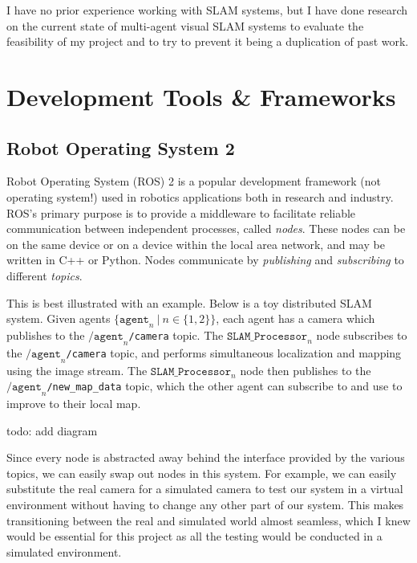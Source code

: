
I have no prior experience working with SLAM systems, but I have done research on the current state of multi-agent visual SLAM systems to evaluate the feasibility of my project and to try to prevent it being a duplication of past work.


\section{Development Tools \& Frameworks}
\label{sec:2.2}

\subsection{Robot Operating System 2}
\label{sec:2.2.1}
Robot Operating System (ROS) 2 is a popular development framework (not operating system!) used in robotics applications both in research and industry. ROS's primary purpose is to provide a middleware to facilitate reliable communication between independent processes, called \textit{nodes}. These nodes can be on the same device or on a device within the local area network, and may be written in C++ or Python. Nodes communicate by \textit{publishing} and \textit{subscribing} to different \textit{topics}.

This is best illustrated with an example. Below is a toy distributed SLAM system. Given agents $\{ \texttt{agent}_n \ | \ n \in \{1, 2\} \}$, each agent has a camera which publishes to the $\texttt{/agent}_n$\verb|/camera| topic. The $\texttt{SLAM\_Processor}_n$ node subscribes to the $\texttt{/agent}_n$\verb|/camera| topic, and performs simultaneous localization and mapping using the image stream. The $\texttt{SLAM\_Processor}_n$ node then publishes to the $\texttt{/agent}_n$\verb|/new_map_data| topic, which the other agent can subscribe to and use to improve to their local map.

todo: add diagram

Since every node is abstracted away behind the interface provided by the various topics, we can easily swap out nodes in this system. For example, we can easily substitute the real camera for a simulated camera to test our system in a virtual environment without having to change any other part of our system. This makes transitioning between the real and simulated world almost seamless, which I knew would be essential for this project as all the testing would be conducted in a simulated environment.

